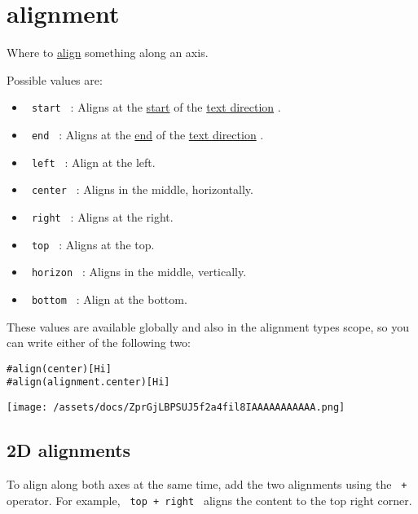 \section{\texorpdfstring{{ alignment }}{ alignment }}\label{summary}

Where to \href{/docs/reference/layout/align/}{align} something along an
axis.

Possible values are:

\begin{itemize}
\tightlist
\item
  \texttt{\ start\ } : Aligns at the
  \href{/docs/reference/layout/direction/\#definitions-start}{start} of
  the \href{/docs/reference/text/text/\#parameters-dir}{text direction}
  .
\item
  \texttt{\ end\ } : Aligns at the
  \href{/docs/reference/layout/direction/\#definitions-end}{end} of the
  \href{/docs/reference/text/text/\#parameters-dir}{text direction} .
\item
  \texttt{\ left\ } : Align at the left.
\item
  \texttt{\ center\ } : Aligns in the middle, horizontally.
\item
  \texttt{\ right\ } : Aligns at the right.
\item
  \texttt{\ top\ } : Aligns at the top.
\item
  \texttt{\ horizon\ } : Aligns in the middle, vertically.
\item
  \texttt{\ bottom\ } : Align at the bottom.
\end{itemize}

These values are available globally and also in the alignment
type\textquotesingle s scope, so you can write either of the following
two:

\begin{verbatim}
#align(center)[Hi]
#align(alignment.center)[Hi]
\end{verbatim}

\texttt{[image: /assets/docs/ZprGjLBPSUJ5f2a4fil8IAAAAAAAAAAA.png]}

\subsection{2D alignments}\label{2d-alignments}

To align along both axes at the same time, add the two alignments using
the \texttt{\ +\ } operator. For example, \texttt{\ top\ +\ right\ }
aligns the content to the top right corner.

